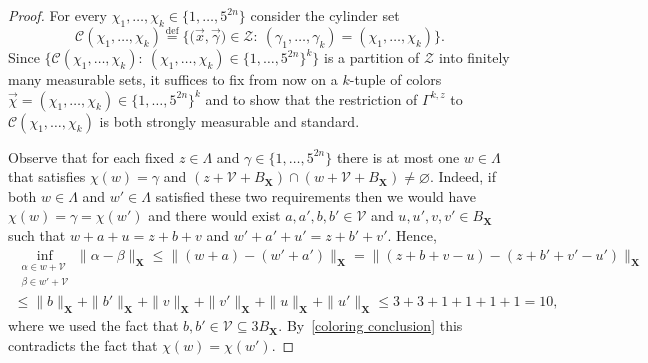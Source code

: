 \documentclass[11pt,reqno]{amsart}
\renewcommand{\le}{\leqslant}
\newcommand{\X}{\mathbf X}
\theoremstyle{remark}
\renewcommand{\subset}{\subseteq}
\newcommand{\eqdef}{\stackrel{\mathrm{def}}{=}}
\renewcommand{\emptyset}{\varnothing}
\renewcommand{\1}{\mathbf 1}
\newcommand{\ZZ}{\mathcal{Z}}
\newcommand{\DD}{\mathscr{V}}
\begin{document}
\begin{proof} For every $\chi_1,\ldots,\chi_k\in \{1,\ldots,5^{2n}\}$ consider the cylinder set
$$
\mathcal{C}(\chi_1,\ldots,\chi_k)\eqdef \Big\{\big(\vec{x},\vec{\gamma}\big)\in \ZZ:\ (\gamma_1,\ldots,\gamma_k)=(\chi_1,\ldots,\chi_k)\Big\}.
$$
Since $\{\mathcal{C}(\chi_1,\ldots,\chi_k):\ (\chi_1,\ldots,\chi_k)\in \{1,\ldots,5^{2n}\}^k\}$ is a partition of $\ZZ$ into finitely many measurable sets, it suffices to fix from now on a $k$-tuple of colors $\vec{\chi}=(\chi_1,\ldots,\chi_k)\in \{1,\ldots,5^{2n}\}^k$ and to show that the restriction of $\Gamma^{k,z}$ to $\mathcal{C}(\chi_1,\ldots,\chi_k)$ is both strongly  measurable and standard.

Observe that for each fixed $z\in \Lambda$ and $\gamma\in \{1,\ldots,5^{2n}\}$ there is at most one $w\in \Lambda$ that satisfies $\chi(w)=\gamma$ and $(z+\DD+B_{\X})\cap (w+\DD+B_{\X})\neq \emptyset$. Indeed, if both $w\in \Lambda$ and $w'\in \Lambda$ satisfied these two requirements then we would have $\chi(w)=\gamma=\chi(w')$ and there would exist $a,a',b,b'\in \DD$ and $u,u',v,v'\in B_{\X}$ such that $w+a+u=z+b+v$ and $w'+a'+u'=z+b'+v'$. Hence,
\begin{multline*}
\inf_{\substack{\alpha\in w+\DD\\ \beta \in w'+\DD}} \|\alpha-\beta\|_{\X} \le \|(w+a)-(w'+a')\|_{\X}=\|(z+b+v-u)-(z+b'+v'-u')\|_{\X}\\\le \|b\|_{\X}+\|b'\|_{\X}+\|v\|_{\X}+\|v'\|_{\X}+\|u\|_{\X}+\|u'\|_{\X}\le 3+3+1+1+1+1=10,
\end{multline*}
where we used the fact that $b,b'\in \DD\subset 3B_{\X}$. By~\eqref{coloring conclusion} this contradicts the fact that $\chi(w)=\chi(w')$.



\end{proof}
\end{document}
